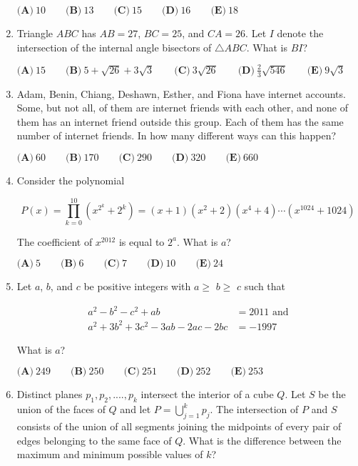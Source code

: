\documentclass{article}
\begin{document}
\begin{enumerate}[label=\arabic*., itemsep=0.5em]
\( \textbf{(A)}\ 10\qquad\textbf{(B)}\ 13\qquad\textbf{(C)}\ 15\qquad\textbf{(D)}\ 16\qquad\textbf{(E)}\ 18 \)\par \vspace{0.5em}\item Triangle \(ABC\) has \(AB=27\), \(BC=25\), and \(CA=26\).  Let \(I\) denote the intersection of the internal angle bisectors of \(\triangle ABC\).  What is \(BI\)?

\( \textbf{(A)}\ 15\qquad\textbf{(B)}\ 5+\sqrt{26}+3\sqrt{3}\qquad\textbf{(C)}\ 3\sqrt{26}\qquad\textbf{(D)}\ \frac{2}{3}\sqrt{546}\qquad\textbf{(E)}\ 9\sqrt{3} \)\par \vspace{0.5em}\item Adam, Benin, Chiang, Deshawn, Esther, and Fiona have internet accounts.  Some, but not all, of them are internet friends with each other, and none of them has an internet friend outside this group.  Each of them has the same number of internet friends.  In how many different ways can this happen?

\( \textbf{(A)}\ 60
\qquad\textbf{(B)}\ 170
\qquad\textbf{(C)}\ 290
\qquad\textbf{(D)}\ 320
\qquad\textbf{(E)}\ 660
 \)\par \vspace{0.5em}\item Consider the polynomial


\begin{equation*}
P(x)=\prod_{k=0}^{10}(x^{2^k}+2^k)=(x+1)(x^2+2)(x^4+4)\cdots (x^{1024}+1024)
\end{equation*}


The coefficient of \(x^{2012}\) is equal to \(2^a\).  What is \(a\)?

\( \textbf{(A)}\ 5
\qquad\textbf{(B)}\ 6
\qquad\textbf{(C)}\ 7
\qquad\textbf{(D)}\ 10
\qquad\textbf{(E)}\ 24
 \)\par \vspace{0.5em}\item Let \(a\), \(b\), and \(c\) be positive integers with \(a\ge\) \(b\ge\) \(c\) such that

\begin{align*}a^{2}-b^{2}-c^{2}+ab&=2011\text{ and}\\
a^{2}+3b^{2}+3c^{2}-3ab-2ac-2bc&=-1997
\end{align*}

What is \(a\)?

\( \textbf{(A)}\ 249\qquad\textbf{(B)}\ 250\qquad\textbf{(C)}\ 251\qquad\textbf{(D)}\ 252\qquad\textbf{(E)}\ 253 \)\par \vspace{0.5em}\item Distinct planes \(p_1,p_2,....,p_k\) intersect the interior of a cube \(Q\). Let \(S\) be the union of the faces of \(Q\) and let \( P =\bigcup_{j=1}^{k}p_{j} \). The intersection of \(P\) and \(S\) consists of the union of all segments joining the midpoints of every pair of edges belonging to the same face of \(Q\). What is the difference between the maximum and minimum possible values of \(k\)?


\end{enumerate}
\end{document}
